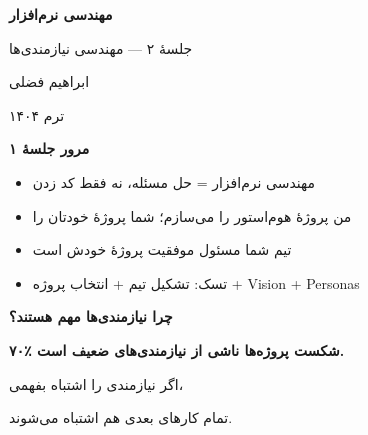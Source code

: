 \documentclass[14pt, a4paper, landscape]{extarticle}
\newcommand{\slide}[1]{%
    \newpage
    \begin{center}
    \begin{minipage}[t]{0.95\textwidth}
    \vspace{0.5cm}
    #1
    \vspace{0.5cm}
    \end{minipage}
    \end{center}
}
\newcommand{\slidetitle}[1]{%
    \begin{center}
        {\LARGE\bfseries\textcolor{primary}{#1}}
    \end{center}
    \vspace{0.5cm}
}
\newcommand{\myaccent}[1]{\textcolor{accent}{#1}}
\begin{document}
\pagestyle{empty}


\begin{center}
    \vspace*{4cm}
    {\color{white}\Huge\bfseries مهندسی نرم‌افزار}
    
    \vspace{1cm}
    
    {\color{accent}\LARGE جلسهٔ ۲ — مهندسی نیازمندی‌ها}
    
    \vspace{2cm}
    
    {\color{white}\Large ابراهیم فضلی}
    
    \vspace{0.5cm}
    
    {\color{white}\large ترم ۱۴۰۴}
\end{center}

\pagestyle{fancy}





\slide{
    \slidetitle{مرور جلسهٔ ۱}
    \vspace{0.5cm}
    \begin{itemize}[itemsep=0.6em]
        \item مهندسی نرم‌افزار = حل مسئله، نه فقط کد زدن
        \item من پروژهٔ هوم‌استور را می‌سازم؛ شما پروژهٔ خودتان را
        \item تیم شما مسئول موفقیت پروژهٔ خودش است
        \item تسک: تشکیل تیم + انتخاب پروژه + Vision + Personas
    \end{itemize}
}

\slide{
    \slidetitle{چرا نیازمندی‌ها مهم هستند؟}
    \vspace{1cm}
    \begin{center}
        {\Large\bfseries\myaccent{۷۰٪ شکست پروژه‌ها ناشی از نیازمندی‌های ضعیف است.}}
        
        \vspace{1.5cm}
        
        {\large اگر نیازمندی را اشتباه بفهمی،}
        
        {\large تمام کارهای بعدی هم اشتباه می‌شوند.}
    \end{center}
}
\end{document}
